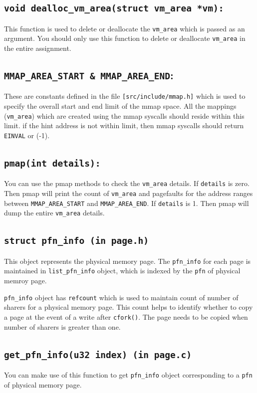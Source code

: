 \documentclass[12pt]{article}
\begin{document}
\subsection*{\tt void dealloc\_vm\_area(struct vm\_area *vm):}
    This function is used to delete or deallocate the {\tt vm\_area} which is passed as an argument. You should only use this function to delete or deallocate {\tt vm\_area} in the entire assignment.
    
\subsection*{ {\tt MMAP\_AREA\_START \& MMAP\_AREA\_END}:}
    These are constants defined in the file {\tt [src/include/mmap.h]} which is used to specify the overall start and end limit of the mmap space. All the mappings ({\tt vm\_area}) which are created using the mmap syscalls should reside within this limit. if the hint address is not within limit, then mmap syscalls should return {\tt EINVAL} or (-1).


\subsection*{\tt pmap(int details):}
    You can use the pmap methods to check the {\tt vm\_area} details. If {\tt details} is zero. Then pmap will print the count of {\tt vm\_area} and pagefaults for the address ranges between  {\tt MMAP\_AREA\_START} and {\tt  MMAP\_AREA\_END}. If {\tt details} is 1. Then pmap will dump the entire {\tt vm\_area} details.

\subsection*{\tt struct pfn\_info (in page.h)}

This object represents the physical memory page. The {\tt pfn\_info} for each page is maintained in {\tt list\_pfn\_info} object, which is indexed by the {\tt pfn} of physical memroy page.

{\tt pfn\_info} object has {\tt refcount} which is used to maintain count of number of sharers for a physical memory page. This count helps to identify whether to copy a page at the event of a write after {\tt cfork()}. The page needs to be copied when number of sharers is greater than one.

\subsection*{\tt get\_pfn\_info(u32 index) (in page.c)}
 You can make use of this function to get {\tt pfn\_info} object corresponding to a {\tt pfn} of physical memory page.
 
\end{document}
